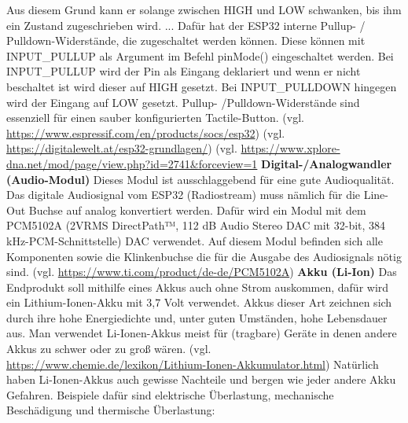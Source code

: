 \documentclass[]{article}
\begin{document}
Aus diesem Grund kann er solange zwischen HIGH und LOW schwanken, bis ihm ein Zustand zugeschrieben wird. \grqq{} ... \glqq Dafür hat der ESP32 interne Pullup- / Pulldown-Widerstände, die zugeschaltet werden können. Diese können mit INPUT\_PULLUP als Argument im Befehl pinMode() eingeschaltet werden.
Bei INPUT\_PULLUP wird der Pin als Eingang deklariert und wenn er nicht beschaltet ist wird dieser auf HIGH gesetzt.
Bei INPUT\_PULLDOWN hingegen wird der Eingang auf LOW gesetzt.\grqq{} Pullup- /Pulldown-Widerstände sind essenziell für einen sauber konfigurierten Tactile-Button.
\vspace{4mm} \newline
(vgl. \url{https://www.espressif.com/en/products/socs/esp32}) \newline
(vgl. \url {https://digitalewelt.at/esp32-grundlagen/})\newline
(vgl. \url {https://www.xplore-dna.net/mod/page/view.php?id=2741&forceview=1}
\vspace{4mm}\newline
\textbf{Digital-/Analogwandler (Audio-Modul)}\newline
Dieses Modul ist ausschlaggebend für eine gute Audioqualität. Das digitale Audiosignal vom ESP32 (Radiostream) muss nämlich für die Line-Out Buchse auf analog konvertiert werden. Dafür wird ein Modul mit dem PCM5102A (\glqq 2VRMS DirectPath™, 112 dB Audio Stereo DAC mit 32-bit, 384 kHz-PCM-Schnittstelle\grqq{}) DAC verwendet. Auf diesem Modul befinden sich alle Komponenten sowie die Klinkenbuchse die für die Ausgabe des Audiosignals nötig sind.
\vspace{4mm} \newline
(vgl. \url{https://www.ti.com/product/de-de/PCM5102A})
\vspace{4mm}\newline
\textbf{Akku (Li-Ion)}\newline
Das Endprodukt soll mithilfe eines Akkus auch ohne Strom auskommen, dafür wird ein Lithium-Ionen-Akku mit 3,7 Volt verwendet. Akkus dieser Art zeichnen sich durch ihre hohe Energiedichte und, unter guten Umständen, hohe Lebensdauer aus. Man verwendet Li-Ionen-Akkus meist für (tragbare) Geräte in denen andere Akkus zu schwer oder zu groß wären. (vgl. \url{https://www.chemie.de/lexikon/Lithium-Ionen-Akkumulator.html}) \vspace{4mm}\newline
Natürlich haben Li-Ionen-Akkus auch gewisse Nachteile und bergen wie jeder andere Akku Gefahren. Beispiele dafür sind elektrische Überlastung, mechanische Beschädigung und thermische Überlastung:
\end{document}
